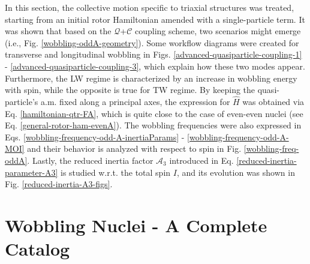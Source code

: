
In this section, the collective motion specific to triaxial structures was treated, starting from an initial rotor Hamiltonian amended with a single-particle term. It was shown that based on the $\mathcal{Q}$+$\mathscr{C}$ coupling scheme, two scenarios might emerge (i.e., Fig. \ref{wobbling-oddA-geometry}). Some workflow diagrams were created for transverse and longitudinal wobbling in Figs. \ref{advanced-quasiparticle-coupling-1} - \ref{advanced-quasiparticle-coupling-3}, which explain how these two modes appear. Furthermore, the LW regime is characterized by an increase in wobbling energy with spin, while the opposite is true for TW regime. By keeping the quasi-particle's a.m. fixed along a principal axes, the expression for $\hat{H}$ was obtained via Eq. \ref{hamiltonian-qtr-FA}, which is quite close to the case of even-even nuclei (see Eq. \ref{general-rotor-ham-evenA}). The wobbling frequencies were also expressed in Eqs. \ref{wobbling-frequency-odd-A-inertiaParams} - \ref{wobbling-frequency-odd-A-MOI} and their behavior is analyzed with respect to spin in Fig. \ref{wobbling-freq-oddA}. Lastly, the reduced inertia factor $\mathscr{A}_3$ introduced in Eq. \ref{reduced-inertia-parameter-A3} is studied w.r.t. the total spin $I$, and its evolution was shown in Fig. \ref{reduced-inertia-A3-figs}.

\section{Wobbling Nuclei - A Complete Catalog}

